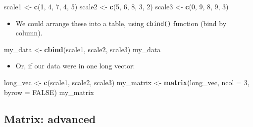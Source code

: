 \documentclass[
]{book}
\newenvironment{Shaded}{\begin{snugshade}}{\end{snugshade}}
\newcommand{\AttributeTok}[1]{\textcolor[rgb]{0.13,0.29,0.53}{#1}}
\newcommand{\ConstantTok}[1]{\textcolor[rgb]{0.56,0.35,0.01}{#1}}
\newcommand{\DecValTok}[1]{\textcolor[rgb]{0.00,0.00,0.81}{#1}}
\newcommand{\FunctionTok}[1]{\textcolor[rgb]{0.13,0.29,0.53}{\textbf{#1}}}
\newcommand{\NormalTok}[1]{#1}
\newcommand{\OtherTok}[1]{\textcolor[rgb]{0.56,0.35,0.01}{#1}}
\providecommand{\tightlist}{%
  \setlength{\itemsep}{0pt}\setlength{\parskip}{0pt}}
\begin{document}
\begin{Shaded}
\begin{Highlighting}[]
\NormalTok{scale1 }\OtherTok{\textless{}{-}} \FunctionTok{c}\NormalTok{(}\DecValTok{1}\NormalTok{, }\DecValTok{4}\NormalTok{, }\DecValTok{7}\NormalTok{, }\DecValTok{4}\NormalTok{, }\DecValTok{5}\NormalTok{)}
\NormalTok{scale2 }\OtherTok{\textless{}{-}} \FunctionTok{c}\NormalTok{(}\DecValTok{5}\NormalTok{, }\DecValTok{6}\NormalTok{, }\DecValTok{8}\NormalTok{, }\DecValTok{3}\NormalTok{, }\DecValTok{2}\NormalTok{)}
\NormalTok{scale3 }\OtherTok{\textless{}{-}} \FunctionTok{c}\NormalTok{(}\DecValTok{0}\NormalTok{, }\DecValTok{9}\NormalTok{, }\DecValTok{8}\NormalTok{, }\DecValTok{9}\NormalTok{, }\DecValTok{3}\NormalTok{)}
\end{Highlighting}
\end{Shaded}

\begin{itemize}
\tightlist
\item
  We could arrange these into a table, using \texttt{cbind()} function (bind by column).
\end{itemize}

\begin{Shaded}
\begin{Highlighting}[]
\NormalTok{my\_data }\OtherTok{\textless{}{-}} \FunctionTok{cbind}\NormalTok{(scale1, scale2, scale3)}
\NormalTok{my\_data}
\end{Highlighting}
\end{Shaded}

\begin{itemize}
\tightlist
\item
  Or, if our data were in one long vector:
\end{itemize}

\begin{Shaded}
\begin{Highlighting}[]
\NormalTok{long\_vec }\OtherTok{\textless{}{-}} \FunctionTok{c}\NormalTok{(scale1, scale2, scale3)}
\NormalTok{my\_matrix }\OtherTok{\textless{}{-}} \FunctionTok{matrix}\NormalTok{(long\_vec, }\AttributeTok{ncol =} \DecValTok{3}\NormalTok{, }\AttributeTok{byrow =} \ConstantTok{FALSE}\NormalTok{)}
\NormalTok{my\_matrix}
\end{Highlighting}
\end{Shaded}

\subsection{Matrix: advanced}\label{matrix-advanced}
\end{document}
